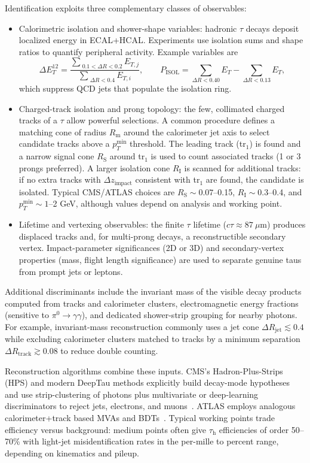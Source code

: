 Identification exploits three complementary classes of observables:

\begin{itemize}
  \item Calorimetric isolation and shower-shape variables: hadronic $\tau$ decays deposit localized energy in ECAL+HCAL. Experiments use isolation sums and shape ratios to quantify peripheral activity. Example variables are
  \[
    \Delta E_T^{12}=\frac{\sum_{\;0.1<\Delta R<0.2} E_{T,j}}{\sum_{\;\Delta R<0.4} E_{T,i}},\qquad
    P_{\mathrm{ISOL}}=\sum_{\Delta R<0.40}E_T - \sum_{\Delta R<0.13}E_T,
  \]
  which suppress QCD jets that populate the isolation ring.
  \item Charged-track isolation and prong topology: the few, collimated charged tracks of a $\tau$ allow powerful selections. A common procedure defines a matching cone of radius $R_{\mathrm{m}}$ around the calorimeter jet axis to select candidate tracks above a $p_T^{\min}$ threshold. The leading track (tr$_1$) is found and a narrow signal cone $R_{\mathrm{S}}$ around tr$_1$ is used to count associated tracks (1 or 3 prongs preferred). A larger isolation cone $R_{\mathrm{I}}$ is scanned for additional tracks: if no extra tracks with $\Delta z_{\text{impact}}$ consistent with tr$_1$ are found, the candidate is isolated. Typical CMS/ATLAS choices are $R_{\mathrm{S}}\sim0.07$–0.15, $R_{\mathrm{I}}\sim0.3$–0.4, and $p_T^{\min}\sim1$–2 GeV, although values depend on analysis and working point.
  \item Lifetime and vertexing observables: the finite $\tau$ lifetime ($c\tau\approx87\ \mu\mathrm{m}$) produces displaced tracks and, for multi-prong decays, a reconstructible secondary vertex. Impact-parameter significances (2D or 3D) and secondary-vertex properties (mass, flight length significance) are used to separate genuine taus from prompt jets or leptons.
\end{itemize}

Additional discriminants include the invariant mass of the visible decay products computed from tracks and calorimeter clusters, electromagnetic energy fractions (sensitive to $\pi^0\to\gamma\gamma$), and dedicated shower-strip grouping for nearby photons. For example, invariant-mass reconstruction commonly uses a jet cone $\Delta R_{\text{jet}}\lesssim0.4$ while excluding calorimeter clusters matched to tracks by a minimum separation $\Delta R_{\text{track}}\gtrsim0.08$ to reduce double counting.

Reconstruction algorithms combine these inputs. CMS's Hadron-Plus-Strips (HPS) and modern DeepTau methods explicitly build decay-mode hypotheses and use strip-clustering of photons plus multivariate or deep-learning discriminators to reject jets, electrons, and muons~\parencite{CMS:2022ydz,CMS_DeepTau}. ATLAS employs analogous calorimeter+track based MVAs and BDTs~\parencite{ATLAS:2022fgo}. Typical working points trade efficiency versus background: medium points often give $\tau_{\mathrm{h}}$ efficiencies of order 50–70\% with light-jet misidentification rates in the per-mille to percent range, depending on kinematics and pileup.

